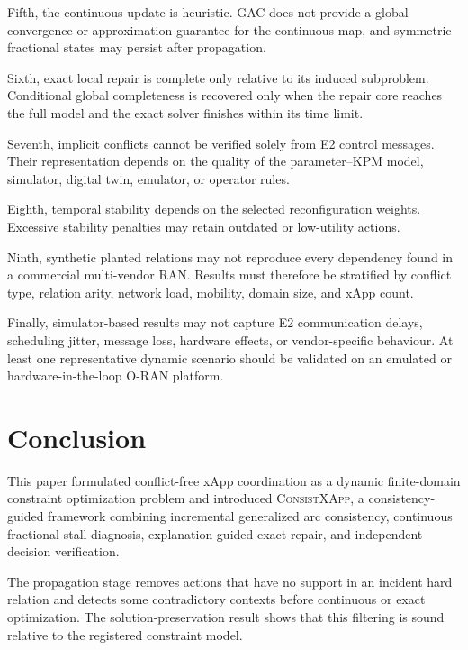 \documentclass[pdflatex,sn-mathphys-num,iicol,oneside]{sn-jnl}
\newcommand{\method}{\textsc{ConsistXApp}}
\begin{document}
Fifth, the continuous update is heuristic. GAC does not provide a
global convergence or approximation guarantee for the continuous map,
and symmetric fractional states may persist after propagation.

Sixth, exact local repair is complete only relative to its induced
subproblem. Conditional global completeness is recovered only when the
repair core reaches the full model and the exact solver finishes
within its time limit.

Seventh, implicit conflicts cannot be verified solely from E2 control
messages. Their representation depends on the quality of the
parameter--KPM model, simulator, digital twin, emulator, or operator
rules.

Eighth, temporal stability depends on the selected reconfiguration
weights. Excessive stability penalties may retain outdated or
low-utility actions.

Ninth, synthetic planted relations may not reproduce every dependency
found in a commercial multi-vendor RAN. Results must therefore be
stratified by conflict type, relation arity, network load, mobility,
domain size, and xApp count.

Finally, simulator-based results may not capture E2 communication
delays, scheduling jitter, message loss, hardware effects, or
vendor-specific behaviour. At least one representative dynamic
scenario should be validated on an emulated or hardware-in-the-loop
O-RAN platform.

\section{Conclusion}
\label{sec:conclusion}

This paper formulated conflict-free xApp coordination as a dynamic
finite-domain constraint optimization problem and introduced
\method, a consistency-guided framework combining incremental
generalized arc consistency, continuous fractional-stall diagnosis,
explanation-guided exact repair, and independent decision
verification.

The propagation stage removes actions that have no support in an
incident hard relation and detects some contradictory contexts before
continuous or exact optimization. The solution-preservation result
shows that this filtering is sound relative to the registered
constraint model.
\end{document}
